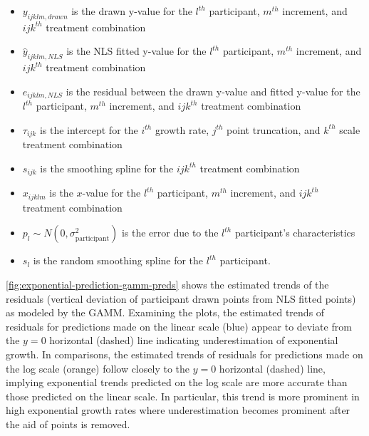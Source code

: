 \documentclass[print]{nuthesis}
\providecommand{\tightlist}{%
  \setlength{\itemsep}{0pt}\setlength{\parskip}{0pt}}
\begin{document}
\begin{itemize}
\tightlist
\item
  \(y_{ijklm,drawn}\) is the drawn y-value for the \(l^{th}\) participant, \(m^{th}\) increment, and \(ijk^{th}\) treatment combination
\item
  \(\hat y_{ijklm,NLS}\) is the NLS fitted y-value for the \(l^{th}\) participant, \(m^{th}\) increment, and \(ijk^{th}\) treatment combination
\item
  \(e_{ijklm,NLS}\) is the residual between the drawn y-value and fitted y-value for the \(l^{th}\) participant, \(m^{th}\) increment, and \(ijk^{th}\) treatment combination
\item
  \(\tau_{ijk}\) is the intercept for the \(i^{th}\) growth rate, \(j^{th}\) point truncation, and \(k^{th}\) scale treatment combination
\item
  \(s_{ijk}\) is the smoothing spline for the \(ijk^{th}\) treatment combination
\item
  \(x_{ijklm}\) is the \(x\)-value for the \(l^{th}\) participant, \(m^{th}\) increment, and \(ijk^{th}\) treatment combination
\item
  \(p_{l} \sim N(0, \sigma^2_\text{participant})\) is the error due to the \(l^{th}\) participant's characteristics
\item
  \(s_{l}\) is the random smoothing spline for the \(l^{th}\) participant.
\end{itemize}

\cref{fig:exponential-prediction-gamm-preds} shows the estimated trends of the residuals (vertical deviation of participant drawn points from NLS fitted points) as modeled by the GAMM.
Examining the plots, the estimated trends of residuals for predictions made on the linear scale (blue) appear to deviate from the \(y=0\) horizontal (dashed) line indicating underestimation of exponential growth.
In comparisons, the estimated trends of residuals for predictions made on the log scale (orange) follow closely to the \(y=0\) horizontal (dashed) line, implying exponential trends predicted on the log scale are more accurate than those predicted on the linear scale.
In particular, this trend is more prominent in high exponential growth rates where underestimation becomes prominent after the aid of points is removed.
\end{document}
